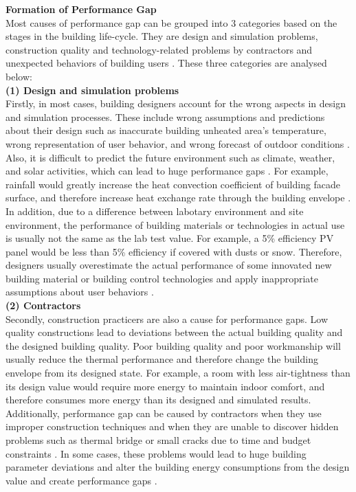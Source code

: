 \documentclass[a4paper, oneside]{discothesis}
\begin{document}
	\textbf{Formation of Performance Gap}\\
		Most causes of performance gap can be grouped into 3 categories based on the stages in the building life-cycle. They are design and simulation problems, construction quality and technology-related problems by contractors and unexpected behaviors of building users \cite{userevaluations,NIU2016275}. These three categories are analysed below:\\
		
		\textbf{(1) Design and simulation problems}\\
		Firstly, in most cases, building designers account for the wrong aspects in design and simulation processes. These include wrong assumptions and predictions about their design such as inaccurate building unheated area's temperature, wrong representation of user behavior, and wrong forecast of outdoor conditions \cite{NIU2016275,HOFFMANN201731}. Also, it is difficult to predict the future environment such as climate, weather, and solar activities, which can lead to huge performance gaps \cite{DIAZ2017393,doi:10.1080/19401493.2012.718797}. For example, rainfall would greatly increase the heat convection coefficient of building facade surface, and therefore increase heat exchange rate through the building envelope \cite{DIAZ2017393}. In addition, due to a difference between labotary environment and site environment, the performance of building materials or technologies in actual use is usually not the same as the lab test value. For example, a 5\% efficiency PV panel would be less than 5\% efficiency if covered with dusts or snow. Therefore, designers usually overestimate the actual performance of some innovated new building material or building control technologies and apply inappropriate assumptions about user behaviors \cite{DEWILDE201440}. \\

		\textbf{(2) Contractors}\\
		Secondly, construction practicers are also a cause for performance gaps. Low quality constructions lead to deviations between the actual building quality and the designed building quality. Poor building quality and poor workmanship will usually reduce the thermal performance and therefore change the building envelope from its designed state. For example, a room with less air-tightness than its design value would require more energy to maintain indoor comfort, and therefore consumes more energy than its designed and simulated results. Additionally, performance gap can be caused by contractors when they use improper construction techniques and when they are unable to discover hidden problems such as thermal bridge or small cracks due to time and budget constraints \cite{DEWILDE201440}. In some cases, these problems would lead to huge building parameter deviations and alter the building energy consumptions from the design value and create performance gaps \cite{FREI2017421,DEWILDE201440}.\\ 
\end{document}

